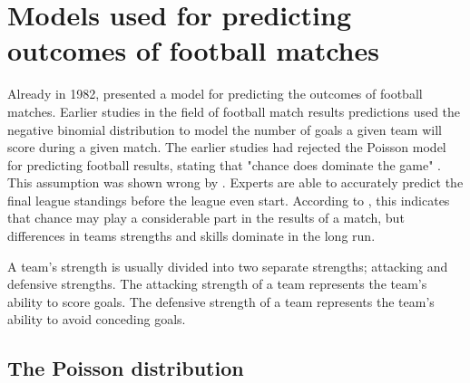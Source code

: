 \section{Models used for predicting outcomes of football matches}

Already in 1982, \citeauthor{bib:maher-1982} presented a model for predicting the outcomes of football matches. Earlier studies in the field of football match results predictions used the negative binomial distribution to model the number of goals a given team will score during a given match. The earlier studies had rejected the Poisson model for predicting football results, stating that "chance does dominate the game" \citep{bib:maher-1982}. This assumption was shown wrong by \citet{bib:hill-1974}. Experts are able to accurately predict the final league standings before the league even start. According to \citet{bib:maher-1982}, this indicates that chance may play a considerable part in the results of a match, but differences in teams strengths and skills dominate in the long run.

A team's strength is usually divided into two separate strengths; attacking and defensive strengths. The attacking strength of a team represents the team's ability to score goals. The defensive strength of a team represents the team's ability to avoid conceding goals.

\subsection{The Poisson distribution}

